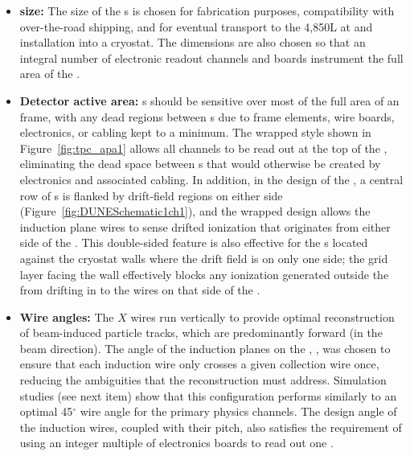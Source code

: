 

\begin{itemize}
\item \textbf{ size:} The size of the s is chosen for fabrication purposes, compatibility with over-the-road shipping, and for eventual transport to the 4,850L at  and installation into %
a cryostat. The dimensions are also chosen so that an integral number of electronic readout channels and boards instrument the full area of the .

\item \textbf{Detector active area:} s should be sensitive over most of the full area of an  frame, with any dead regions between s due to frame elements, wire boards, electronics, or cabling kept to a minimum.  The wrapped style shown in Figure~\ref{fig:tpc_apa1} allows all channels to be read out at the top of the , eliminating the dead space between s that would otherwise be created by electronics and associated cabling. In addition, in the design of the , a central row of 
s is flanked by drift-field regions on either side (Figure~\ref{fig:DUNESchematic1ch1}), %
and the wrapped design allows the induction plane wires to sense drifted ionization that originates from either side of the .  This double-sided feature is also effective for the s located against the cryostat walls where the drift field is on only one side; the grid layer facing the wall effectively blocks any ionization generated outside the  from drifting in to the wires on that side of the .        

\item \textbf{Wire angles:} The $X$ wires run vertically to provide optimal reconstruction of beam-induced particle tracks, which are predominantly forward (in the beam direction). The angle of the induction planes on the , \apainducwireangle, was chosen to ensure that each induction wire only crosses a given collection wire once, reducing the ambiguities that the reconstruction must address.  Simulation studies (see next item) show that this configuration performs similarly to an optimal 45$^\circ$ wire angle for the primary  physics channels.  The design angle of the induction wires, coupled with their pitch, also satisfies the requirement %
of using an integer multiple of electronics boards to read out one .


\end{itemize}

